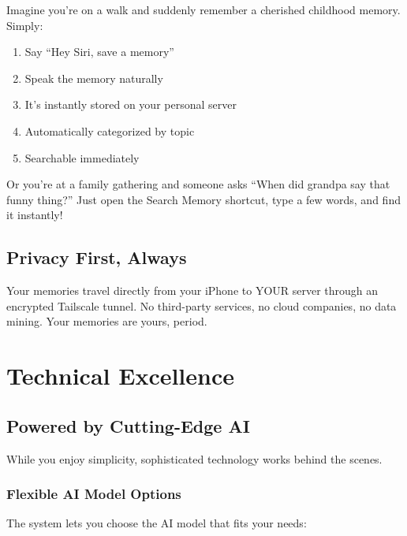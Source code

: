 \documentclass[11pt,letterpaper]{article}
\begin{document}
Imagine you're on a walk and suddenly remember a cherished childhood memory. Simply:
\begin{enumerate}
    \item Say ``Hey Siri, save a memory''
    \item Speak the memory naturally
    \item It's instantly stored on your personal server
    \item Automatically categorized by topic
    \item Searchable immediately
\end{enumerate}

Or you're at a family gathering and someone asks ``When did grandpa say that funny thing?'' Just open the Search Memory shortcut, type a few words, and find it instantly!

\subsection{Privacy First, Always}

Your memories travel directly from your iPhone to YOUR server through an encrypted Tailscale tunnel. No third-party services, no cloud companies, no data mining. Your memories are yours, period.

\newpage
\section{Technical Excellence}

\subsection{Powered by Cutting-Edge AI}

While you enjoy simplicity, sophisticated technology works behind the scenes.

\subsubsection{Flexible AI Model Options}

The system lets you choose the AI model that fits your needs:
\end{document}
